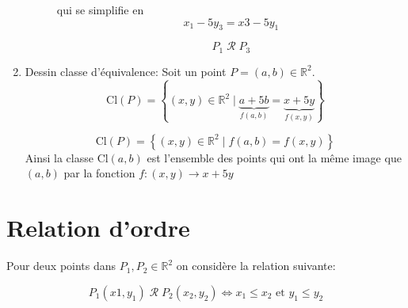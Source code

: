 \documentclass[12pt,a4paper,dvipsnames]{article}
\begin{document}
\begin{enumerate}
\begin{description}
                    qui se simplifie en 
                    \begin{equation}
                        x_1 - 5y_3 = x3 - 5y_1
                    \end{equation}

                    \begin{equation}
                        P_1\;\mathcal{R}\; P_3
                    \end{equation}

            \end{description}
        \item Dessin classe d'équivalence:
            Soit un point $P=(a,b) \in \mathbb{R}^2$.
            \begin{equation}
                \label{eq:class_equiv_q4}
                \text{Cl}(P) = \left\{ (x,y) \in \mathbb{R}^2\;|\; \underbrace{a
                + 5b}_{f(a,b)} = \underbrace{x +
        5y}_{f(x,y)}\right\}
            \end{equation}

            \begin{equation}
                \label{eq:class_equiv_q4}
                \text{Cl}(P) = \left\{ (x,y) \in \mathbb{R}^2\;|\; f(a,b) =
                f(x,y)\right\}
            \end{equation}
            Ainsi la classe $\text{Cl}(a,b)$ est l'ensemble des points qui
            ont la même image que $(a,b)$ par la fonction
            $f:(x,y)\longrightarrow x + 5y$
    \end{enumerate}

\section{Relation d'ordre}%
\label{sec:relation_d_ordre}

Pour deux points dans $P_1, P_2 \in\mathbb{R}^2$ on considère la relation
suivante:

\begin{equation}
    \label{eq:relation_ordre}
    P_1(x1,y_1) \;\mathcal{R}\; P_2(x_2, y_2)\iff x_1 \leq x_2 \text{ et }
        y_1\leq y_2
\end{equation}
\end{document}
